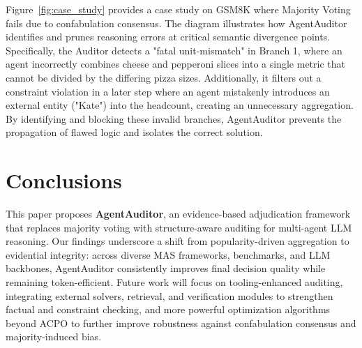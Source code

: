 \documentclass{article}
\theoremstyle{plain}
\theoremstyle{definition}
\theoremstyle{remark}
\begin{document}
Figure~\ref{fig:case_study} provides a case study on GSM8K where Majority Voting fails due to confabulation consensus. The diagram illustrates how AgentAuditor identifies and prunes reasoning errors at critical semantic divergence points. Specifically, the Auditor detects a "fatal unit-mismatch" in Branch 1, where an agent incorrectly combines cheese and pepperoni slices into a single metric that cannot be divided by the differing pizza sizes. Additionally, it filters out a constraint violation in a later step where an agent mistakenly introduces an external entity ("Kate") into the headcount, creating an unnecessary aggregation. By identifying and blocking these invalid branches, AgentAuditor prevents the propagation of flawed logic and isolates the correct solution.




\section{Conclusions}
This paper proposes \textbf{AgentAuditor}, an evidence-based adjudication framework that replaces majority voting with structure-aware auditing for multi-agent LLM reasoning. Our findings underscore a shift from popularity-driven aggregation to evidential integrity: across diverse MAS frameworks, benchmarks, and LLM backbones, AgentAuditor consistently improves final decision quality while remaining token-efficient. Future work will focus on tooling-enhanced auditing, integrating external solvers, retrieval, and verification modules to strengthen factual and constraint checking, and more powerful optimization algorithms beyond ACPO to further improve robustness against confabulation consensus and majority-induced bias.
\end{document}
